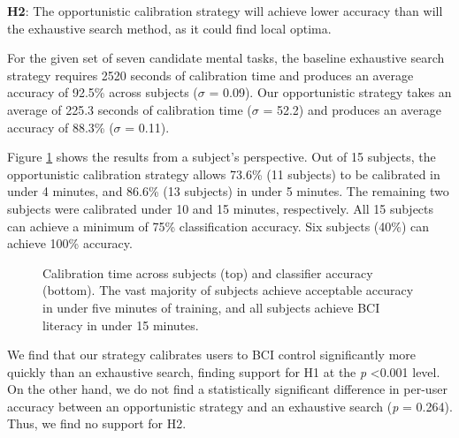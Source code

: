 \textbf{H2}: The opportunistic calibration strategy will achieve lower accuracy than will the exhaustive search method, as it could find local optima.

\hfill


For the given set of seven candidate mental tasks, the baseline exhaustive search strategy requires 2520 seconds of calibration time and produces an average accuracy of 92.5\% across subjects (\textit{$\sigma$} = 0.09). Our opportunistic strategy takes an average of 225.3 seconds of calibration time (\textit{$\sigma$} = 52.2) and produces an average accuracy of 88.3\% (\textit{$\sigma$} = 0.11).

Figure \ref{fig:calibration_results} shows the results from a subject's perspective. Out of 15 subjects, the opportunistic calibration strategy allows 73.6\% (11 subjects) to be calibrated in under 4 minutes, and 86.6\% (13 subjects) in under 5 minutes. The remaining two subjects were calibrated under 10 and 15 minutes, respectively. All 15 subjects can achieve a minimum of 75\% classification accuracy. Six subjects (40\%) can achieve 100\% accuracy.

\begin{figure}[!h]
  \vspace{-0.2cm}
  \centering
   {}
  \caption{Calibration time across subjects (top) and classifier accuracy (bottom). The vast majority of subjects achieve acceptable accuracy in under five minutes of training, and all subjects achieve BCI literacy in under 15 minutes. }
  \label{fig:calibration_results}
  \vspace{-0.1cm}
\end{figure}

We find that our strategy calibrates users to BCI control significantly more quickly than an exhaustive search, finding support for H1 at the \textit{p} \textless 0.001 level. On the other hand, we do not find a statistically significant difference in per-user accuracy between an opportunistic strategy and an exhaustive search (\textit{p} = 0.264). Thus, we find no support for H2.

